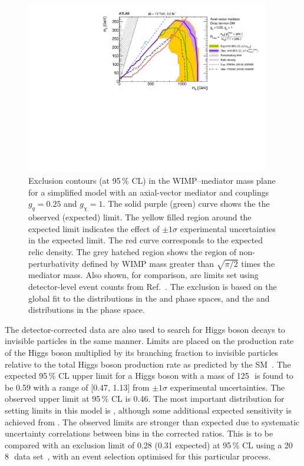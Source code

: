 \documentclass[cernpreprint,txfonts,UKenglish,texlive=2016]{\ATLASLATEXPATH atlasdoc}
\begin{document}
\begin{figure}
          \includegraphics[width=0.95\textwidth]{plots/interpretations/DMA/DMA_limitPlot_CLs_TotalCov_GlobalFit.pdf} 
        \caption {Exclusion contours (at 95\,\% CL) in the WIMP--mediator
          mass plane for a simplified model with an axial-vector
          mediator and couplings $g_q = 0.25$ and $g_{\chi}=1$.
The solid purple (green) curve shows the the observed
(expected) limit. The yellow filled region around the expected limit indicates the effect of 
$\pm 1\sigma$ experimental uncertainties in the expected limit.
The red curve corresponds to the expected relic
density. The grey hatched region shows the region of non-perturbativity
defined by WIMP mass greater than $\sqrt{\pi/2}$ times the mediator
mass.
Also shown, for comparison, are limits set using detector-level event
counts from Ref.~\cite{EXOT-2015-03}.
The exclusion is based on the global fit to the \ptmiss{}
distributions in the \onejet{} and \vbf{} phase spaces, and the \mjj{}
and \dphijj{} distributions in the \vbf{} phase space.
}
  \label{fig:exclusions-dma}
\end{figure}

The detector-corrected data are also used to search for Higgs boson decays to invisible particles in the same manner.
Limits are placed on the production rate of the Higgs boson multiplied by its branching fraction to invisible particles
relative to the total Higgs boson production rate as predicted by the SM~\cite{deFlorian:2016spz}.
The expected 95\,\% CL upper limit for a Higgs boson with a mass of 125\,\GeV\ is found to be
0.59
with a range of
[0.47, 1.13]
from $\pm 1\sigma$ experimental uncertainties.
The observed upper limit at 95\,\% CL is
0.46.
The most important distribution for setting limits in this model is
\mjj{}, although some additional expected sensitivity is achieved
from \dphijj{}. 
The observed limits are stronger than expected due to systematic uncertainty correlations between bins in the corrected ratios. 
This is to be compared with an exclusion limit of 0.28 (0.31 expected) at 95\,\% CL using a 20~\ifb{}
8\,\TeV\ data set~\cite{HIGG-2013-16}, with an event selection optimised for this particular process. 
\end{document}
